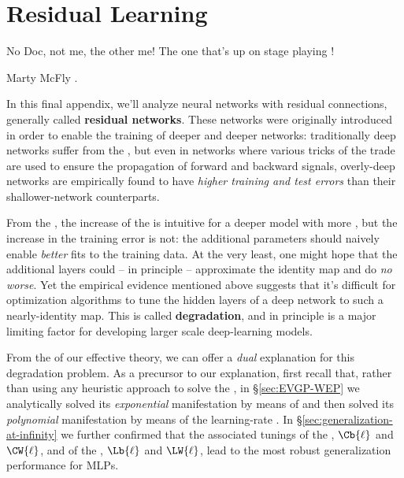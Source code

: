 
\chapter{Residual Learning}
\label{app:residual}



\epigraph{No Doc, not me, the other me! The one that's up on stage playing !}{Marty McFly \cite{BttFP2}.}



\noindent{}In this final appendix, we'll analyze neural networks with residual connections, generally called  \textbf{residual networks}.
These networks
were originally introduced in order to enable the training of deeper and deeper networks: traditionally deep networks suffer from the , but even in networks where various tricks of the trade are used to ensure the propagation of forward and backward signals, 
overly-deep 
networks are empirically found to have \emph{higher training and test errors} than their shallower-network counterparts.


From the , 
 the increase of the 
 is intuitive for a deeper model with more , but the increase in the training error is not: the additional parameters should naively enable \emph{better} fits to the training data.
At the very least, one might hope that the additional layers could 
-- in principle --
approximate the identity map and do \emph{no worse}.
Yet the empirical evidence mentioned above suggests that it's difficult for optimization algorithms 
to tune the
hidden layers of a deep network %
to such a nearly-identity map.
This is called \textbf{degradation}, and in principle 
is
a major limiting factor for developing larger scale deep-learning models.



From the  of our effective theory, we can offer a \emph{dual} explanation for this degradation problem.
As a precursor to our explanation, first recall that, rather than using any heuristic approach to solve the , in \S\ref{sec:EVGP-WEP}
we analytically solved its \emph{exponential} manifestation by means of  and then solved its \emph{polynomial} manifestation by means of the learning-rate .
In \S\ref{sec:generalization-at-infinity} we further confirmed that the associated tunings of the , $\Cb{\ell}$ and $\CW{\ell}$, and of the , $\Lb{\ell}$ and $\LW{\ell}$,  lead to the most robust generalization performance for MLPs. 

